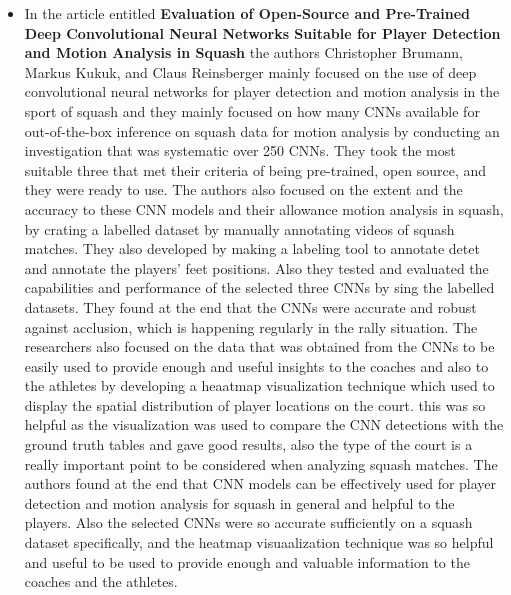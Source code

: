 \documentclass[12pt]{article}
\begin{document}
\begin{itemize}
        \item In the article entitled \textbf{Evaluation of Open-Source and Pre-Trained Deep Convolutional Neural Networks Suitable for Player Detection and Motion Analysis in Squash} \cite{s21134550} the authors Christopher Brumann, Markus Kukuk, and Claus Reinsberger mainly focused on the use of deep convolutional neural networks for player detection and motion analysis in the sport of squash and they mainly focused on how many CNNs available for out-of-the-box inference on squash data for motion analysis by conducting an investigation that was systematic over 250 CNNs. They took the most suitable three that met their criteria of being pre-trained, open source, and they were ready to use. The authors also focused on the extent and the accuracy to these CNN models and their allowance motion analysis in squash, by crating a labelled dataset by manually annotating videos of squash matches. They also developed by making a labeling tool to annotate detet and annotate the players’ feet positions. Also they tested and evaluated the capabilities and performance of the selected three CNNs by sing the labelled datasets. They found at the end that the CNNs were accurate and robust against acclusion, which is happening regularly in the rally situation. The researchers also focused on the data that was obtained from the CNNs to be easily used to provide enough and useful insights to the coaches and also to the athletes by developing a heaatmap visualization technique which used to display the spatial distribution of player locations on the court. this was so helpful as the visualization was used to compare the CNN detections with the ground truth tables and gave good results, also the type of the court is a really important point to be considered when analyzing squash matches. The authors found at the end that CNN models can be effectively used for player detection and motion analysis for squash in general and helpful to the players. Also the selected CNNs were so accurate sufficiently on a squash dataset specifically, and the heatmap visuaalization technique was so helpful and useful to be used to provide enough and valuable information to the coaches and the athletes.


\end{itemize}
\end{document}
